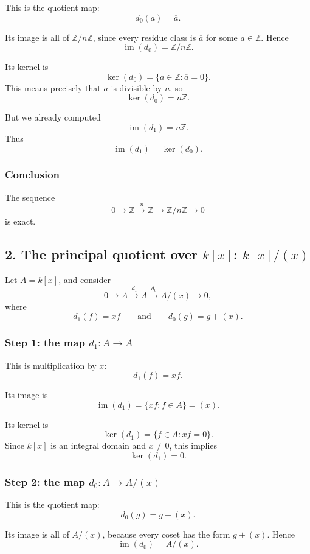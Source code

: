 \documentclass[12pt,a4paper]{article}
\theoremstyle{notespace}
\theoremstyle{definition}
\begin{document}
This is the quotient map:
\[
d_0(a)=\overline{a}.
\]

Its image is all of \(\mathbb Z/n\mathbb Z\), since every residue class is \(\overline{a}\) for some \(a\in\mathbb Z\). Hence
\[
\operatorname{im}(d_0)=\mathbb Z/n\mathbb Z.
\]

Its kernel is
\[
\ker(d_0)=\{a\in\mathbb Z : \overline{a}=0\}.
\]
This means precisely that \(a\) is divisible by \(n\), so
\[
\ker(d_0)=n\mathbb Z.
\]

But we already computed
\[
\operatorname{im}(d_1)=n\mathbb Z.
\]
Thus
\[
\operatorname{im}(d_1)=\ker(d_0).
\]

\subsubsection*{Conclusion}

The sequence
\[
0 \longrightarrow \mathbb Z \xrightarrow{\cdot n} \mathbb Z \longrightarrow \mathbb Z/n\mathbb Z \longrightarrow 0
\]
is exact.

\bigskip

\subsection{2. The principal quotient over \(k[x]\): \(k[x]/(x)\)}

Let \(A=k[x]\), and consider
\[
0 \longrightarrow A \xrightarrow{d_1} A \xrightarrow{d_0} A/(x) \longrightarrow 0,
\]
where
\[
d_1(f)=xf
\qquad\text{and}\qquad
d_0(g)=g+(x).
\]

\subsubsection*{Step 1: the map \(d_1:A\to A\)}

This is multiplication by \(x\):
\[
d_1(f)=xf.
\]

Its image is
\[
\operatorname{im}(d_1)=\{xf : f\in A\}=(x).
\]

Its kernel is
\[
\ker(d_1)=\{f\in A : xf=0\}.
\]
Since \(k[x]\) is an integral domain and \(x\neq 0\), this implies
\[
\ker(d_1)=0.
\]

\subsubsection*{Step 2: the map \(d_0:A\to A/(x)\)}

This is the quotient map:
\[
d_0(g)=g+(x).
\]

Its image is all of \(A/(x)\), because every coset has the form \(g+(x)\). Hence
\[
\operatorname{im}(d_0)=A/(x).
\]
\end{document}
